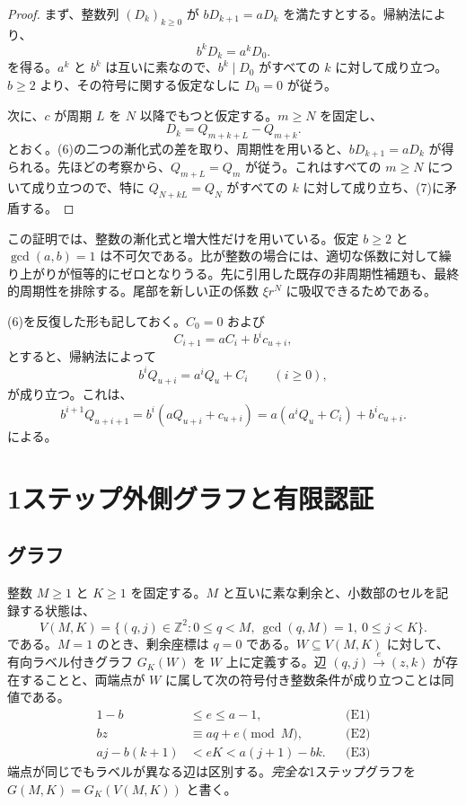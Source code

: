 \documentclass[11pt,reqno]{amsart}
\theoremstyle{definition}
\theoremstyle{definition}
\theoremstyle{remark}
\begin{document}
\begin{proof}\leavevmode\label{proof:4}
まず、整数列 \((D_k)_{k\ge0}\) が \(bD_{k+1}=aD_k\) を満たすとする。帰納法により、
\[
b^kD_k=a^kD_0.
\]
を得る。\(a^k\) と \(b^k\) は互いに素なので、\(b^k\mid D_0\) がすべての \(k\) に対して成り立つ。\(b\ge2\) より、その符号に関する仮定なしに \(D_0=0\) が従う。

次に、\(c\) が周期 \(L\) を \(N\) 以降でもつと仮定する。\(m\ge N\) を固定し、
\[
D_k=Q_{m+k+L}-Q_{m+k}.
\]
とおく。(6)の二つの漸化式の差を取り、周期性を用いると、\(bD_{k+1}=aD_k\) が得られる。先ほどの考察から、\(Q_{m+L}=Q_m\) が従う。これはすべての \(m\ge N\) について成り立つので、特に
\(Q_{N+kL}=Q_N\)
がすべての \(k\) に対して成り立ち、(7)に矛盾する。\qedhere
\end{proof}

この証明では、整数の漸化式と増大性だけを用いている。仮定 \(b\ge2\) と \(\gcd(a,b)=1\) は不可欠である。比が整数の場合には、適切な係数に対して繰り上がりが恒等的にゼロとなりうる。先に引用した既存の非周期性補題も、最終的周期性を排除する。尾部を新しい正の係数 \(\xi r^N\) に吸収できるためである。

(6)を反復した形も記しておく。\(C_0=0\) および
\[
C_{i+1}=aC_i+b^ic_{u+i},
\]
とすると、帰納法によって
\[
b^iQ_{u+i}=a^iQ_u+C_i\qquad(i\ge0),
\tag{8}\label{eq:8}
\]
が成り立つ。これは、
\[
b^{i+1}Q_{u+i+1}=b^i(aQ_{u+i}+c_{u+i})=a(a^iQ_u+C_i)+b^ic_{u+i}.
\]
による。

\section{1ステップ外側グラフと有限認証}\label{sec:3}

\subsection{グラフ}\label{sec:3.1}

整数 \(M\ge1\) と \(K\ge1\) を固定する。\(M\) と互いに素な剰余と、小数部のセルを記録する状態は、
\[
V(M,K)=\{(q,j)\in\mathbb Z^2:0\le q<M,\ \gcd(q,M)=1,\ 0\le j<K\}.
\tag{9}\label{eq:9}
\]
である。\(M=1\) のとき、剰余座標は \(q=0\) である。\(W\subseteq V(M,K)\) に対して、有向ラベル付きグラフ \(G_K(W)\) を \(W\) 上に定義する。辺 \((q,j)\xrightarrow{e}(z,k)\) が存在することと、両端点が \(W\) に属して次の符号付き整数条件が成り立つことは同値である。
\[
\begin{aligned}
1-b&\le e\le a-1, &&\text{(E1)}\\
bz&\equiv aq+e\pmod M, &&\text{(E2)}\\
aj-b(k+1)&<eK<a(j+1)-bk. &&\text{(E3)}
\end{aligned}
\tag{10}\label{eq:10}
\]
端点が同じでもラベルが異なる辺は区別する。\emph{完全な}1ステップグラフを \(G(M,K)=G_K(V(M,K))\) と書く。
\end{document}
